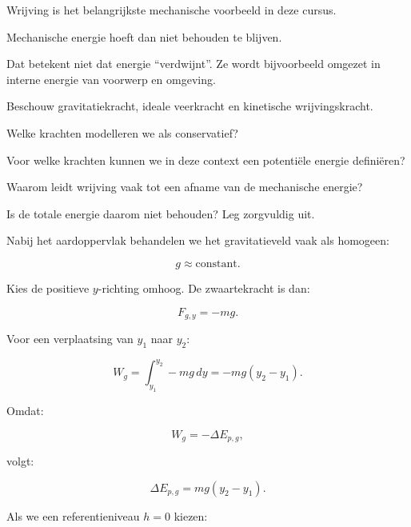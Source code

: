 \documentclass{ximera}
\begin{document}
Wrijving is het belangrijkste mechanische voorbeeld in deze cursus.

Mechanische energie hoeft dan niet behouden te blijven.

Dat betekent niet dat energie ``verdwijnt''. Ze wordt bijvoorbeeld omgezet in
interne energie van voorwerp en omgeving.


\begin{oefening}{\oefU\ESS}

Beschouw gravitatiekracht, ideale veerkracht en kinetische wrijvingskracht.

\begin{question}
Welke krachten modelleren we als conservatief?
\end{question}

\begin{question}
Voor welke krachten kunnen we in deze context een potentiële energie
definiëren?
\end{question}

\begin{question}
Waarom leidt wrijving vaak tot een afname van de mechanische energie?
\end{question}

\begin{question}
Is de totale energie daarom niet behouden? Leg zorgvuldig uit.
\end{question}

\end{oefening}



Nabij het aardoppervlak behandelen we het gravitatieveld vaak als homogeen:

\[
g\approx\text{constant}.
\]

Kies de positieve $y$-richting omhoog. De zwaartekracht is dan:

\[
F_{g,y}=-mg.
\]

Voor een verplaatsing van $y_1$ naar $y_2$:

\[
W_g
=
\int_{y_1}^{y_2}-mg\,dy
=
-mg(y_2-y_1).
\]

Omdat:

\[
W_g=-\Delta E_{p,g},
\]

volgt:

\[
\Delta E_{p,g}=mg(y_2-y_1).
\]

Als we een referentieniveau $h=0$ kiezen:
\end{document}
